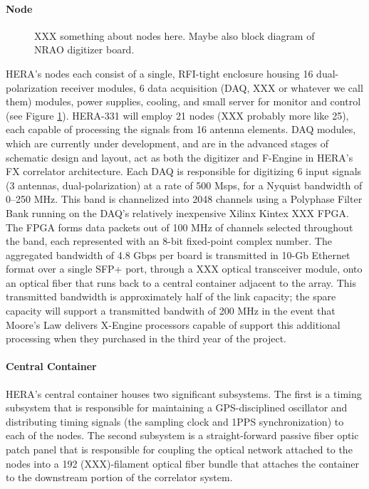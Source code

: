 \documentclass[preprint]{aastex}
\begin{document}
\paragraph{Node}

\begin{figure}[!ht]\centering
\caption{
XXX something about nodes here.  Maybe also block diagram of NRAO digitizer board.
}\label{fig:node_arch}
\end{figure}

HERA's nodes each consist of a single, RFI-tight enclosure housing 16 dual-polarization receiver modules, 
6 data acquisition (DAQ, XXX or whatever we call them)
modules, power supplies, cooling, and small server for monitor and control (see Figure \ref{fig:node_arch}).  HERA-331 will employ
21 nodes (XXX probably more like 25), each capable of processing the signals from 16 antenna elements.
DAQ modules, which are currently under development, and are in the advanced stages of schematic design and layout,
act as both the digitizer and F-Engine in HERA's FX correlator architecture.  Each DAQ
is responsible for digitizing 6 input signals (3 antennas, dual-polarization) at a rate
of 500 Msps, for a Nyquist bandwidth of 0--250 MHz.  This band is channelized into 2048 channels
using a Polyphase Filter Bank running on the DAQ's relatively inexpensive Xilinx Kintex XXX FPGA.
The FPGA forms data packets out of 100 MHz of channels selected throughout the band, each represented
with an 8-bit fixed-point complex number.  The aggregated bandwidth of 4.8 Gbps per board is transmitted in
10-Gb Ethernet format over a single SFP+ port, through a XXX optical transceiver module, onto an optical
fiber that runs back to a central container adjacent to the array.  
This transmitted bandwidth is approximately
half of the link capacity; the spare capacity will support a transmitted bandwith
of 200 MHz in the event that Moore's Law delivers X-Engine processors capable of support
this additional processing when they purchased in the third year of the project.

\paragraph{Central Container}

HERA's central container houses two significant subsystems.  The first is a timing subsystem
that is responsible for maintaining a GPS-disciplined oscillator and distributing timing
signals (the sampling clock and 1PPS synchronization) to each of the nodes.  The second
subsystem is a straight-forward passive fiber optic patch panel that is responsible for coupling
the optical network attached to the nodes into a 192 (XXX)-filament optical fiber bundle
that attaches the container to the downstream portion of the correlator system.
\end{document}
